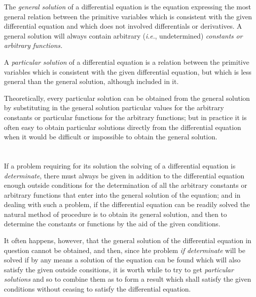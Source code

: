 \documentclass[oneside,12pt]{book}
\begin{document}
The \textit{general solution} of a differential equation is the equation expressing the most general relation between the primitive variables which is consistent with the given differential equation and which does not involved differentials or derivatives. A general solution will always contain arbitrary (\textit{i.e.}, undetermined) \textit{constants \emph{or} arbitrary functions.} \par 

A \textit{particular solution} of a differential equation is a relation between the primitive variables which is consistent with the given differential equation, but which is less general than the general solution, although included in it. \par 

Theoretically, every particular solution can be obtained from the general solution by substituting in the general solution particular values for the arbitrary constants or particular functions for the arbitrary functions; but in practice it is often easy to obtain particular solutions directly from the differential equation when it would be difficult or impossible to obtain the general solution. \par 

\section{} If a problem requiring for its solution the solving of a differential equation is \textit{determinate}, there must always be given in addition to the differential equation enough outside conditions for the determination of all the arbitrary constants or arbitrary functions that enter into the general solution of the equation; and in dealing with such a problem, if the differential equation can be readily solved the natural method of procedure is to obtain its general solution, and then to determine the constants or functions by the aid of the given conditions. \par 

It often happens, however, that the general solution of the differential equation in question cannot be obtained, and then, since hte problem \textit{if determinate} will be solved if by any means a solution of the equation can be found which will also satisfy the given outside consitions, it is worth while to try to get \textit{particular solutions} and so to combine them as to form a result which shall satisfy the given conditions without ceasing to satisfy the differential equation. \par 
\end{document}
